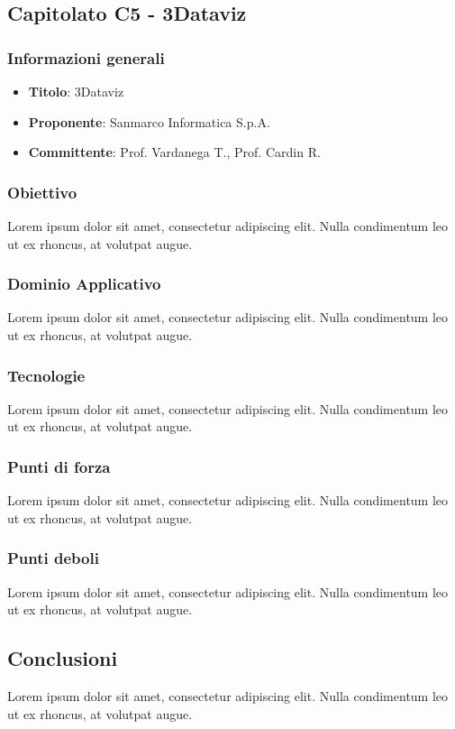 \subsection{Capitolato C5 - 3Dataviz}
     \subsubsection{Informazioni generali}
        \begin{itemize}
            \item \textbf{Titolo}: 3Dataviz
            \item \textbf{Proponente}: Sanmarco Informatica S.p.A.
            \item \textbf{Committente}: Prof. Vardanega T., Prof. Cardin R.
        \end{itemize}
     \subsubsection{Obiettivo}
    Lorem ipsum dolor sit amet, consectetur adipiscing elit. Nulla condimentum leo ut ex rhoncus, at volutpat augue.
     \subsubsection{Dominio Applicativo}
    Lorem ipsum dolor sit amet, consectetur adipiscing elit. Nulla condimentum leo ut ex rhoncus, at volutpat augue.
    \subsubsection{Tecnologie}
    Lorem ipsum dolor sit amet, consectetur adipiscing elit. Nulla condimentum leo ut ex rhoncus, at volutpat augue.
    \subsubsection{Punti di forza}
    Lorem ipsum dolor sit amet, consectetur adipiscing elit. Nulla condimentum leo ut ex rhoncus, at volutpat augue.
    \subsubsection{Punti deboli}
    Lorem ipsum dolor sit amet, consectetur adipiscing elit. Nulla condimentum leo ut ex rhoncus, at volutpat augue.
    \subsection{Conclusioni}
    Lorem ipsum dolor sit amet, consectetur adipiscing elit. Nulla condimentum leo ut ex rhoncus, at volutpat augue.